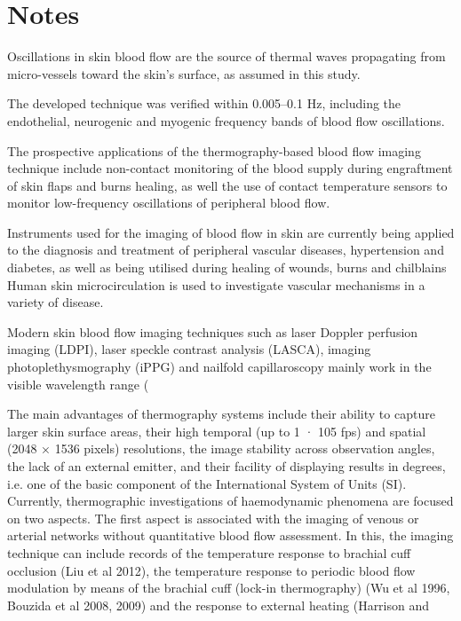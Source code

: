 

\section{Notes}

Oscillations in skin blood flow are the source of thermal waves
propagating from micro-vessels toward the skin’s surface, as assumed in
this study.

The developed technique was verified within
0.005–0.1 Hz, including the endothelial, neurogenic and myogenic frequency
bands of blood flow oscillations. 

The prospective
applications of the thermography-based blood flow imaging technique include
non-contact monitoring of the blood supply during engraftment of skin flaps
and burns healing, as well the use of contact temperature sensors to monitor
low-frequency oscillations of peripheral blood flow.

Instruments used for the imaging of blood flow in skin are currently being applied to the
diagnosis and treatment of peripheral vascular diseases, hypertension and diabetes, as well
as being utilised during healing of wounds, burns and chilblains Human skin microcirculation
is used to investigate vascular mechanisms in a variety of disease.

Modern skin blood flow imaging techniques such as laser Doppler perfusion imaging
(LDPI), laser speckle contrast analysis (LASCA), imaging photoplethysmography (iPPG)
and nailfold capillaroscopy mainly work in the visible wavelength range (

The main advantages of thermography
systems include their ability to capture larger skin surface areas, their high temporal
(up to 1 · 105 fps) and spatial (2048 × 1536 pixels) resolutions, the image stability across
observation angles, the lack of an external emitter, and their facility of displaying results in
degrees, i.e. one of the basic component of the International System of Units (SI).
Currently, thermographic investigations of haemodynamic phenomena are focused on two
aspects. The first aspect is associated with the imaging of venous or arterial networks without
quantitative blood flow assessment. In this, the imaging technique can include records of the
temperature response to brachial cuff occlusion (Liu et al 2012), the temperature response to
periodic blood flow modulation by means of the brachial cuff (lock-in thermography) (Wu
et al 1996, Bouzida et al 2008, 2009) and the response to external heating (Harrison and




